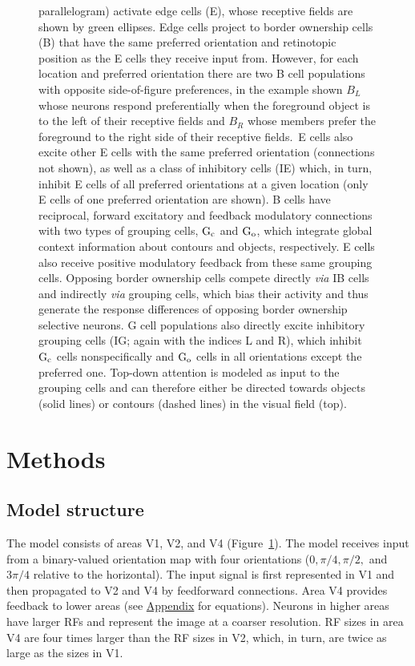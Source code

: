 \begin{figure}[t!]
{{parallelogram) activate edge cells (E), whose receptive fields are   shown by green ellipses. Edge cells project to border ownership cells (B) that have the same preferred orientation and retinotopic position as the E cells they receive input from. However, for each location and preferred orientation there are two B cell populations with opposite side-of-figure preferences, in the example shown $B_{L}$ whose neurons respond preferentially when the foreground object is to the left of their receptive fields and $B_{R}$ whose members prefer the foreground to the right side of their receptive fields.\ E cells also excite other E cells with the same preferred orientation (connections not shown),  as well as a class of inhibitory cells (IE) which, in turn, inhibit E cells of all preferred orientations at a given location (only E cells of one preferred orientation are shown). B cells have reciprocal, forward excitatory and feedback modulatory connections with two types of grouping cells, $\rm G_c$ and $\rm G_o$, which integrate global context information about contours and objects, respectively. E cells also receive positive modulatory feedback from these same grouping cells. Opposing border ownership cells compete directly {\em via} IB cells and indirectly {\em via} grouping cells, which bias their activity and thus generate the response differences of opposing border ownership selective neurons. G cell populations also directly excite
inhibitory grouping cells (IG; again with the indices L and R), which inhibit $\rm G_c$ cells nonspecifically and $\rm G_o$ cells in all orientations except the preferred one.}
Top-down attention is modeled as input to the grouping cells and can therefore either be directed towards objects (solid lines) or contours (dashed lines) in the visual field (top).}
\label{Fig:anatomy}
\end{figure}

\section{Methods} 
\label{sec:model}

\subsection{Model structure}

The model consists of areas V1, V2, and V4
(Figure~\ref{Fig:anatomy}). The model receives input from a
binary-valued orientation map with four orientations
($0, \pi/4, \pi/2,$ and $3\pi/4$ relative to the horizontal). The
input signal is first represented in V1 and then propagated to V2 and
V4 by feedforward connections. Area V4 provides feedback to lower
areas (see \hyperref[sec:appendix_eq]{Appendix} for equations). Neurons in higher
areas have larger RFs and represent the image at a coarser
resolution. RF sizes in area V4 are four times larger than the RF
sizes in V2, which, in turn, are twice as large as the sizes in V1.

